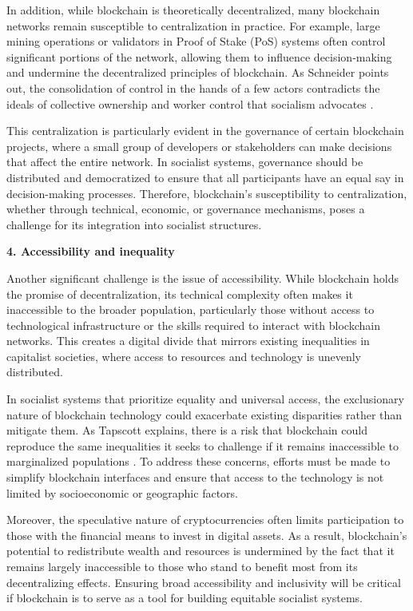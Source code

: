\begin{refsection}
In addition, while blockchain is theoretically decentralized, many blockchain networks remain susceptible to centralization in practice. For example, large mining operations or validators in Proof of Stake (PoS) systems often control significant portions of the network, allowing them to influence decision-making and undermine the decentralized principles of blockchain. As Schneider points out, the consolidation of control in the hands of a few actors contradicts the ideals of collective ownership and worker control that socialism advocates \cite[pp.~98-101]{schneider2018}.

This centralization is particularly evident in the governance of certain blockchain projects, where a small group of developers or stakeholders can make decisions that affect the entire network. In socialist systems, governance should be distributed and democratized to ensure that all participants have an equal say in decision-making processes. Therefore, blockchain’s susceptibility to centralization, whether through technical, economic, or governance mechanisms, poses a challenge for its integration into socialist structures.

\textbf{4. Accessibility and inequality}

Another significant challenge is the issue of accessibility. While blockchain holds the promise of decentralization, its technical complexity often makes it inaccessible to the broader population, particularly those without access to technological infrastructure or the skills required to interact with blockchain networks. This creates a digital divide that mirrors existing inequalities in capitalist societies, where access to resources and technology is unevenly distributed.

In socialist systems that prioritize equality and universal access, the exclusionary nature of blockchain technology could exacerbate existing disparities rather than mitigate them. As Tapscott explains, there is a risk that blockchain could reproduce the same inequalities it seeks to challenge if it remains inaccessible to marginalized populations \cite[pp.~112-115]{tapscott2016}. To address these concerns, efforts must be made to simplify blockchain interfaces and ensure that access to the technology is not limited by socioeconomic or geographic factors.

Moreover, the speculative nature of cryptocurrencies often limits participation to those with the financial means to invest in digital assets. As a result, blockchain’s potential to redistribute wealth and resources is undermined by the fact that it remains largely inaccessible to those who stand to benefit most from its decentralizing effects. Ensuring broad accessibility and inclusivity will be critical if blockchain is to serve as a tool for building equitable socialist systems.


\end{refsection}
